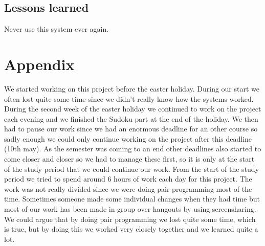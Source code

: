 \documentclass{report}
\newcommand{\mychapter}[2]{
    \setcounter{chapter}{#1}
    \setcounter{section}{0}
    \chapter*{#2}
    \addcontentsline{toc}{chapter}{#2}
}
\begin{document}
\section{Lessons learned}
Never use this system ever again.
\mychapter{4}{Appendix}
We started working on this project before the easter holiday. During our start we often lost quite some time since we didn't really know how the systems worked. During the second week of the easter holiday we continued to work on the project each evening and we finished the Sudoku part at the end of the holiday. We then had to pause our work since we had an enormous deadline for an other course so sadly enough we could only continue working on the project after this deadline (10th may). As the semester was coming to an end other deadlines also started to come closer and closer so we had to manage these first, so it is only at the start of the study period that we could continue our work. From the start of the study period we tried to spend around 6 hours of work each day for this project. The work was not really divided since we were doing pair programming most of the time. Sometimes someone made some individual changes when they had time but most of our work has been made in group over hangouts by using screensharing. We could argue that by doing pair programming we lost quite some time, which is true, but by doing this we worked very closely together and we learned quite a lot.  
\end{document}
